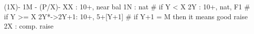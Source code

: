 (1X)- 1M - (P/X)- 
XX : 10+, near bal
1N : nat
# if Y < X
2Y : 10+, nat, F1
# if Y >= X
2Y*->2Y+1: 10+, 5+[Y+1]  # if Y+1 = M then it means good raise
2X : comp. raise
